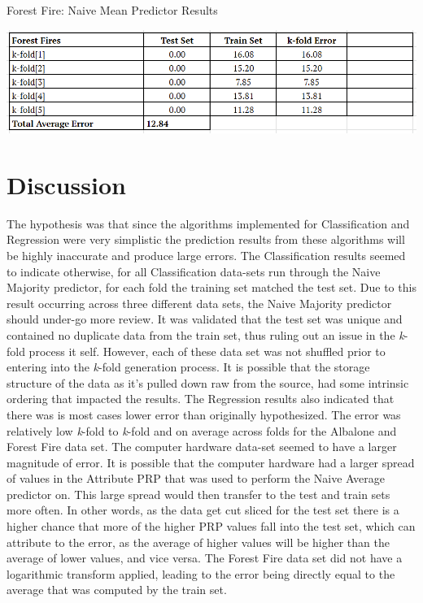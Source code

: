 \documentclass[twoside,11pt]{article}
\begin{document}
\begin{table}[h!]
	\begin{center}
		\caption{Forest Fire: Naive Mean Predictor Results}
		\label{tab:table6}
		\includegraphics[scale=.6]{FF_Results}\newline
	\end{center}
\end{table}



\newpage

\section{Discussion}
The hypothesis was that since the algorithms implemented for Classification and Regression were very simplistic the prediction results from these algorithms will be highly inaccurate and produce large errors.\newline
The Classification results seemed to indicate otherwise, for all Classification data-sets run through the Naive Majority predictor, for each fold the training set matched the test set. Due to this result occurring across three different data sets, the Naive Majority predictor should under-go more review. It was validated that the test set was unique and contained no duplicate data from the train set, thus ruling out an issue in the \textit{k}-fold process it self. However, each of these data set was not shuffled prior to entering into the \textit{k}-fold generation process. It is possible that the storage structure of the data as it's pulled down raw from the source, had some intrinsic ordering that impacted the results.\newline
\hspace*{10mm}The Regression results also indicated that there was is most cases lower error than originally hypothesized. The error was relatively low \textit{k}-fold to \textit{k}-fold and on average across folds for the Albalone and Forest Fire data set. The computer hardware data-set seemed to have a larger magnitude of error. It is possible that the computer hardware had a larger spread of values in the Attribute PRP that was used to perform the Naive Average predictor on. This large spread would then transfer to the test and train sets more often. In other words, as the data get cut sliced for the test set there is a higher chance that more of the higher PRP values fall into the test set, which can attribute to the error, as the average of higher values will be higher than the average of lower values, and vice versa. The Forest Fire data set did not have a logarithmic transform applied, leading to the error being directly equal to the average that was computed by the train set. 
\end{document}
